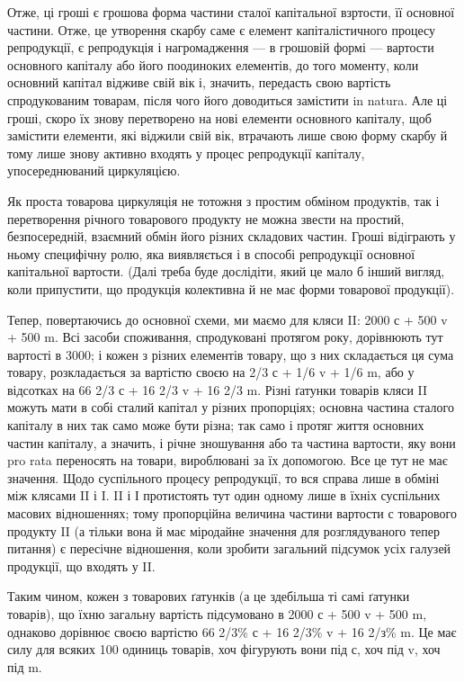 \parcont{}  %
Отже, ці гроші є грошова форма частини сталої капітальної взртости,
її основної частини. Отже, це утворення скарбу саме є елемент капіталістичного
процесу репродукції, є репродукція і нагромадження — в грошовій
формі — вартости основного капіталу або його поодиноких елементів,
до того моменту, коли основний капітал відживе свій вік і, значить, передасть
свою вартість спродукованим товарам, після чого його доводиться
замістити in natura. Але ці гроші, скоро їх знову перетворено на нові
елементи основного капіталу, щоб замістити елементи, які віджили свій
вік, втрачають лише свою форму скарбу й тому лише знову активно
входять у процес репродукції капіталу, упосереднюваний циркуляцією.

Як проста товарова циркуляція не тотожня з простим обміном продуктів,
так і перетворення річного товарового продукту не можна звести на
простий, безпосередній, взаємний обмін його різних складових частин.
Гроші відіграють у ньому специфічну ролю, яка виявляється і в способі
репродукції основної капітальної вартости. (Далі треба буде дослідіти,
який це мало б інший вигляд, коли припустити, що продукція колективна
й не має форми товарової продукції).

Тепер, повертаючись до основної схеми, ми маємо для кляси II:
2000 с + 500 v + 500 m. Всі засоби споживання, спродуковані протягом
року, дорівнюють тут вартості в 3000; і кожен з різних елементів товару,
що з них складається ця сума товару, розкладається за вартістю своєю
на 2/3 с + 1/6 v + 1/6 m, або у відсотках на 66 2/3 с + 16 2/3 v + 16 2/3 m.
Різні ґатунки товарів кляси II можуть мати в собі сталий капітал у
різних пропорціях; основна частина сталого капіталу в них так само
може бути різна; так само і протяг життя основних частин капіталу, а
значить, і річне зношування або та частина вартости, яку вони pro rata
переносять на товари, вироблювані за їх допомогою. Все це тут не має
значення. Щодо суспільного процесу репродукції, то вся справа лише в
обміні між клясами II і I. II і І протистоять тут один одному лише в
їхніх суспільних масових відношеннях; тому пропорційна величина частини
вартости с товарового продукту II (а тільки вона й має міродайне
значення для розглядуваного тепер питання) є пересічне відношення, коли
зробити загальний підсумок усіх галузей продукції, що входять у II.

Таким чином, кожен з товарових ґатунків (а це здебільша ті самі
ґатунки товарів), що їхню загальну вартість підсумовано в 2000 с + 500 v +
500 m, однаково дорівнює своєю вартістю 66 2/3\% с + 16 2/3\% v +
16 2/з\% m. Це має силу для всяких 100 одиниць товарів, хоч фігурують
вони під с, хоч під v, хоч під m.

